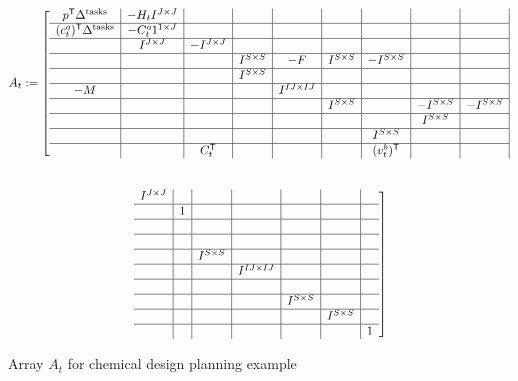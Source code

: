 \begin{landscape}
\begin{figure}[ht]
\caption{Array $A_t$ for chemical design planning example}
\label{CHEM:at}
\small{
\begin{multline*}
A_t\assign\left[
\begin{array}{c|c|c|c|c|c|c|c|c|}%
	p\trp \Delta^{\text{tasks}}&-H_t I^{J\times J}&&&&&&&%
\\ \hline
	(c^o_t)\trp \Delta^{\text{tasks}}&-C^o_t 1^{1\times J}&&&&&&&%
\\ \hline
	&I^{J\times J}&-I^{J\times J}&&&&&&%
\\ \hline
	&&&I^{S\times S}&-F&I^{S\times S}&-I^{S\times S}&&%
\\ \hline
	&&&I^{S\times S}&&&&&%
\\ \hline
	-M&&&&I^{IJ\times IJ}&&&&%
\\ \hline
	&&&&&I^{S\times S}&&-I^{S\times S}&-I^{S\times S}%
\\ \hline
	&&&&&&&I^{S\times S}&%
\\ \hline
	&&&&&&I^{S\times S}&&%
\\ \hline
	&&C_t\trp&&&&(v_t^b)\trp&&%
\end{array}
\right.\\[0.3in]
\left.
\begin{array}{c|c|c|c|c|c|c}
	I^{J\times J}&&&&&&\\ \hline
	&1&&&&&\\ \hline
	&&&&&&\\ \hline
	&&&&&&\\ \hline
	&&I^{S\times S}&&&&\\ \hline
	&&&I^{IJ\times IJ}&&&\\ \hline
	&&&&&&\\ \hline
	&&&&I^{S\times S}&&\\ \hline
	&&&&&I^{S\times S}&\\ \hline
	&&&&&&1
\end{array}
\right]\\
\end{multline*}
}
\end{figure}
\end{landscape}

